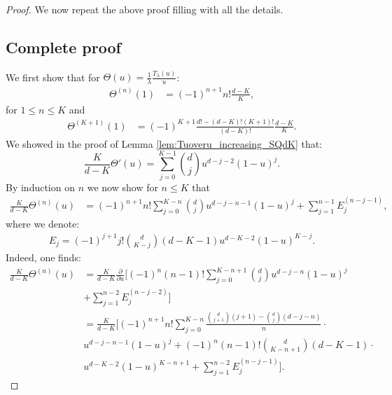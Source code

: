 \documentclass[12pt]{report}
\begin{document}
\begin{proof}
We now repeat the above proof filling with all the details.  
\subsection*{Complete proof}
We first show that for $\Theta(u)=\frac{1}{\lambda}\frac{T_\lambda(u)}{u}$:
\begin{align}
\Theta^{(n)}(1) &= (-1)^{n+1} n! \frac{d-K}{K},  \label{eq:Dtheta_lowerK}
\end{align}
for $1 \leq n \leq K $  and
\begin{align}
\Theta^{(K+1)}(1) &= (-1)^{K+1} \frac{d! - (d-K)! (K+1)!}{(d-K)!} \frac{d-K}{K}. \label{eq:Dtheta_Kplus1}
\end{align}
We showed in the proof of Lemma \ref{lem:Tuoveru_increasing_SQdK} that:
$$
\frac{K}{d-K} \Theta'(u) = \sum_{j=0}^{K-1} \binom{d}{j} u^{d-j-2} (1-u)^j.
$$
By induction on $n$ we now show for $n \leq K$ that
\begin{align}\label{eq:Theta_n_diff}
\frac{K}{d-K} \Theta^{(n)}(u)&= (-1)^{n+1} n! \sum_{j=0}^{K-n} \binom{d}{j} u^{d-j-n-1} (1-u)^j + \sum_{j=1}^{n-1} E_j^{(n-j-1)},
\end{align}
where we denote:
\begin{align}\label{eq:Ej}
E_j= (-1)^{j+1} j! \binom{d}{K-j} (d-K-1) u^{d-K-2} (1-u)^{K-j}.
\end{align}
Indeed, one finds:
\begin{align*}
\frac{K}{d-K} \Theta^{(n)}(u)
&= \frac{K}{d-K} \frac{\partial}{\partial u} \bigg[ (-1)^n (n-1)! \sum_{j=0}^{K-n+1} \binom{d}{j} u^{d-j-n} (1-u)^j\\
&+ \sum_{j=1}^{n-2} E_j^{(n-j-2)} \bigg]\\
&= \frac{K}{d-K} \bigg[ (-1)^{n+1} n! \sum_{j=0}^{K-n} \frac{\binom{d}{j+1}(j+1) - \binom{d}{j} (d-j-n)}{n} \cdot \\
& u^{d-j-n-1} (1-u)^j + (-1)^n (n-1)! \binom{d}{K-n+1} (d-K-1) \cdot\\
& u^{d-K-2} (1-u)^{K-n+1} +\sum_{j=1}^{n-2} E_j^{(n-j-1)}\bigg].
\end{align*}

\end{proof}
\end{document}
